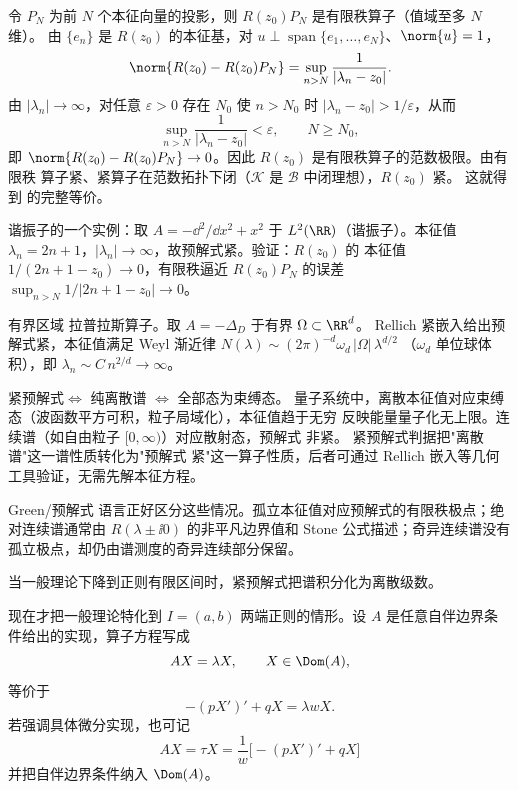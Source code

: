 令 $P_N$ 为前 $N$ 个本征向量的投影，则 $R(z_0)P_N$ 是有限秩算子（值域至多 $N$ 维）。
由 $\{e_n\}$ 是 $R(z_0)$ 的本征基，对
$u\perp\operatorname{span}\{e_1,\ldots,e_N\}$、$\norm{u}=1$，
\begin{equation*}
 \norm{R(z_0)-R(z_0)P_N}
 =\sup_{n>N}\frac1{|\lambda_n-z_0|}.
\end{equation*}
由 $|\lambda_n|\to\infty$，对任意 $\varepsilon>0$ 存在 $N_0$ 使 $n>N_0$ 时
$|\lambda_n-z_0|>1/\varepsilon$，从而
\begin{equation*}
 \sup_{n>N}\frac1{|\lambda_n-z_0|}<\varepsilon,
 \qquad N\ge N_0,
\end{equation*}
即 $\norm{R(z_0)-R(z_0)P_N}\to0$。因此 $R(z_0)$ 是有限秩算子的范数极限。由有限秩
算子紧、紧算子在范数拓扑下闭（$\mathcal K$ 是 $\mathcal B$ 中闭理想），$R(z_0)$ 紧。
这就得到 的完整等价。

谐振子的一个实例：取 $A=-\dd^2/\dd x^2+x^2$ 于 $L^2(\RR)$（谐振子）。本征值
$\lambda_n=2n+1$，$|\lambda_n|\to\infty$，故预解式紧。验证：$R(z_0)$ 的
本征值 $1/(2n+1-z_0)\to0$，有限秩逼近 $R(z_0)P_N$ 的误差
$\sup_{n>N}1/|2n+1-z_0|\to0$。

有界区域 拉普拉斯算子。取 $A=-\Delta_D$ 于有界 $\Omega\subset\RR^d$。
Rellich 紧嵌入给出预解式紧，本征值满足 Weyl 渐近律
$N(\lambda)\sim(2\pi)^{-d}\omega_d\,|\Omega|\,\lambda^{d/2}$
（$\omega_d$ 单位球体积），即 $\lambda_n\sim C\,n^{2/d}\to\infty$。

紧预解式$\Leftrightarrow$ 纯离散谱 $\Leftrightarrow$ 全部态为束缚态。
量子系统中，离散本征值对应束缚态（波函数平方可积，粒子局域化），本征值趋于无穷
反映能量量子化无上限。连续谱（如自由粒子 $[0,\infty)$）对应散射态，预解式 非紧。
紧预解式判据把"离散谱"这一谱性质转化为"预解式 紧"这一算子性质，后者可通过
Rellich 嵌入等几何工具验证，无需先解本征方程。

Green/预解式 语言正好区分这些情况。孤立本征值对应预解式的有限秩极点；绝对连续谱通常由 $R(\lambda\pm\ii0)$ 的非平凡边界值和 Stone 公式描述；奇异连续谱没有孤立极点，却仍由谱测度的奇异连续部分保留。

当一般理论下降到正则有限区间时，紧预解式把谱积分化为离散级数。

现在才把一般理论特化到 $I=(a,b)$ 两端正则的情形。设 $A$ 是任意自伴边界条件给出的实现，算子方程写成
\begin{equation*}AX=\lambda X,
 \qquad X\in\Dom(A),
\end{equation*}
等价于
\begin{equation*}-(pX')'+qX=\lambda wX.
\end{equation*}
若强调具体微分实现，也可记
\begin{equation*}AX=\tau X=\frac{1}{w}\bigl[-(pX')'+qX\bigr]
\end{equation*}
并把自伴边界条件纳入 $\Dom(A)$。

